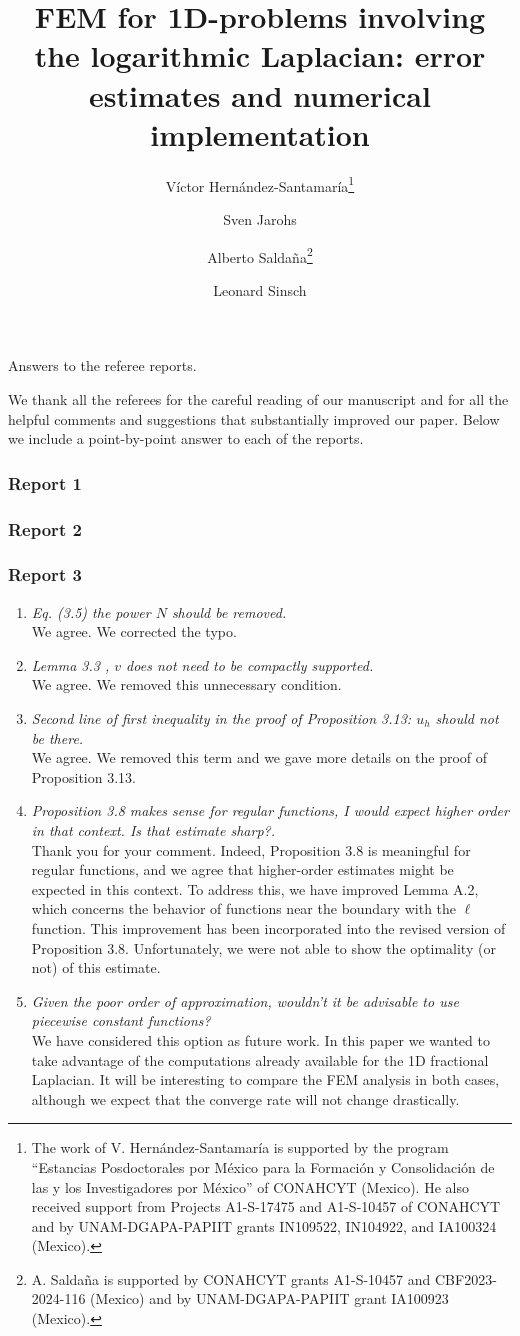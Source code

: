 \documentclass[11 pt]{article}
\title{FEM for 1D-problems involving the logarithmic Laplacian: error estimates and numerical implementation}
\author{V\'ictor Hern\'andez-Santamar\'ia\footnote{The work of V. Hern\'andez-Santamar\'ia is supported by the program ``Estancias Posdoctorales por México para la Formación y Consolidación de las y los Investigadores por México'' of CONAHCYT (Mexico). He also received support from Projects A1-S-17475 and A1-S-10457 of CONAHCYT and by UNAM-DGAPA-PAPIIT grants IN109522, IN104922, and IA100324 (Mexico).} \and
 Sven Jarohs
 \and
Alberto Salda\~{n}a\footnote{ A. Saldaña is supported  by  
CONAHCYT grants A1-S-10457 and  CBF2023-2024-116 (Mexico) and by UNAM-DGAPA-PAPIIT grant IA100923 (Mexico).}\and
Leonard Sinsch
}
\date{}
\numberwithin{equation}{section}
\begin{document}
\begin{center}
 Answers to the referee reports.
\end{center}

We thank all the referees for the careful reading of our manuscript and for all the helpful comments and suggestions that substantially improved our paper. Below we include a point-by-point answer to each of the reports.


\subsubsection*{Report 1}





\subsubsection*{Report 2}




\subsubsection*{Report 3}

\begin{enumerate}
\item \emph{Eq. (3.5) the power $N$ should be removed.}\\
We agree. We corrected the typo.
\item \emph{Lemma 3.3 , $v$ does not need to be compactly supported.}\\
We agree. We removed this unnecessary condition.
\item \emph{Second line of first inequality in the proof of Proposition 3.13: $u_h$ should not be there.}\\
We agree. We removed this term and we gave more details on the proof of Proposition 3.13.
\item \emph{Proposition 3.8 makes sense for regular functions, I would expect higher order in that context. Is that estimate sharp?.}\\
Thank you for your comment. Indeed, Proposition 3.8 is meaningful for regular functions, and we agree that higher-order estimates might be expected in this context. To address this, we have improved Lemma A.2, which concerns the behavior of functions near the boundary with the $\ell$ function. This improvement has been incorporated into the revised version of Proposition 3.8.  Unfortunately, we were not able to show the optimality (or not) of this estimate.
\item \emph{Given the poor order of approximation, wouldn't it be advisable to use piecewise constant functions?}\\
We have considered this option as future work.  In this paper we wanted to take advantage of the computations already available for the 1D fractional Laplacian. It will be interesting to compare the FEM analysis in both cases, although we expect that the converge rate will not change drastically.
\end{enumerate}
\end{document}
